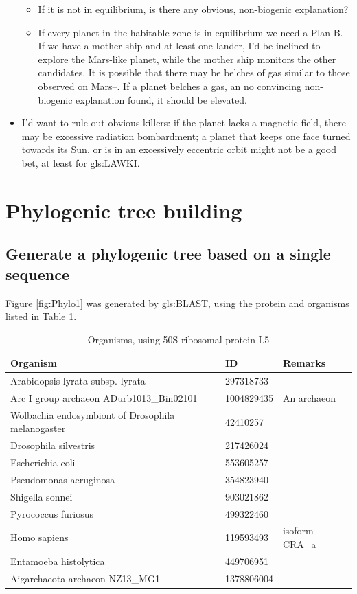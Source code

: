 \documentclass[]{article}
\begin{document}
\begin{itemize}
\begin{itemize}
		\item If it is not in equilibrium, is there any obvious, non-biogenic explanation?
		\item If every planet in the habitable zone is in equilibrium we need a Plan B. If we have a mother ship and at least one lander, I'd be inclined to explore the Mars-like planet, while the mother ship monitors the other candidates. It is possible that there may be belches of gas similar to those observed on Mars--\cite{nasa2019curiosity}. If a planet belches a gas, an no convincing non-biogenic explanation found, it should be elevated. 
	\end{itemize}
	\item I'd want to rule out obvious killers: if the planet lacks a magnetic field, there may be excessive radiation bombardment; a planet that keeps one face turned towards its Sun, or is in an excessively eccentric orbit might not be a good bet, at least for \gls{gls:LAWKI}.  
\end{itemize}

\section{Phylogenic tree building}

\subsection{ Generate a phylogenic tree based on a single sequence}

Figure \ref{fig:Phylo1} was generated by \gls{gls:BLAST}, using the protein and organisms listed in Table \ref{tab:organisms}.
\begin{table}[H]
	\caption{Organisms, using 50S ribosomal protein L5}\label{tab:organisms}
	\centering
	\begin{tabular}{|l |l | p{5cm} |}
		\hline
		\textbf{Organism} & \textbf{ID} & \textbf{Remarks}\\ \hline
		Arabidopsis lyrata subsp. lyrata &297318733 & \\ \hline
		Arc I group archaeon ADurb1013\_Bin02101&1004829435&An archaeon\\ \hline
		Wolbachia endosymbiont of Drosophila melanogaster  &42410257 & \\ \hline
		Drosophila silvestris&217426024&\\\hline
		Escherichia coli &553605257 & \\ \hline
		Pseudomonas aeruginosa &354823940 & \\ \hline
		Shigella sonnei &903021862 & \\ \hline
		Pyrococcus furiosus &499322460 & \\ \hline
		Homo sapiens & 119593493&isoform CRA\_a  \\ \hline
		Entamoeba histolytica  &449706951&\\ \hline
		Aigarchaeota archaeon NZ13\_MG1&1378806004&\\ \hline
	\end{tabular}
\end{table}
\end{document}
